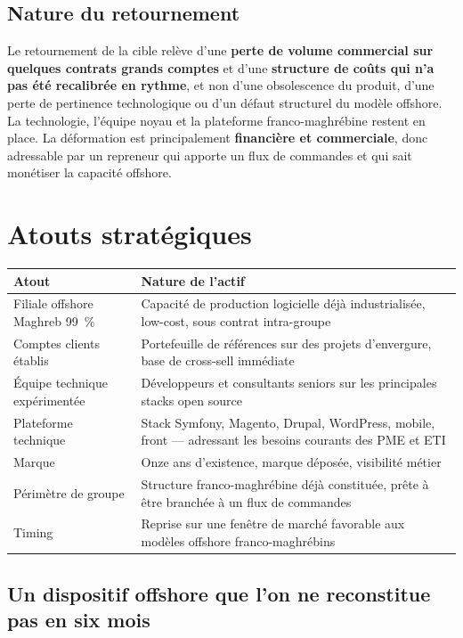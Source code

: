 \documentclass[11pt,a4paper]{article}
\begin{document}
\subsection{Nature du retournement}

Le retournement de la cible relève d'une \textbf{perte de volume commercial sur quelques contrats grands comptes} et d'une \textbf{structure de coûts qui n'a pas été recalibrée en rythme}, et non d'une obsolescence du produit, d'une perte de pertinence technologique ou d'un défaut structurel du modèle offshore. La technologie, l'équipe noyau et la plateforme franco-maghrébine restent en place. La déformation est principalement \textbf{financière et commerciale}, donc adressable par un repreneur qui apporte un flux de commandes et qui sait monétiser la capacité offshore.

\section{Atouts stratégiques}

\begin{longtable}{L{5.5cm}L{9.5cm}}
\toprule
\textbf{Atout} & \textbf{Nature de l'actif} \\
\midrule
\endhead
Filiale offshore Maghreb 99~\% & Capacité de production logicielle déjà industrialisée, low-cost, sous contrat intra-groupe \\
Comptes clients établis & Portefeuille de références sur des projets d'envergure, base de cross-sell immédiate \\
Équipe technique expérimentée & Développeurs et consultants seniors sur les principales stacks open source \\
Plateforme technique & Stack Symfony, Magento, Drupal, WordPress, mobile, front --- adressant les besoins courants des PME et ETI \\
Marque & Onze ans d'existence, marque déposée, visibilité métier \\
Périmètre de groupe & Structure franco-maghrébine déjà constituée, prête à être branchée à un flux de commandes \\
Timing & Reprise sur une fenêtre de marché favorable aux modèles offshore franco-maghrébins \\
\bottomrule
\end{longtable}

\subsection{Un dispositif offshore que l'on ne reconstitue pas en six mois}
\end{document}
